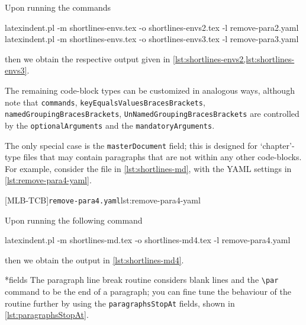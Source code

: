 	Upon running the commands \begin{widepage} \begin{commandshell}
latexindent.pl -m shortlines-envs.tex -o shortlines-envs2.tex -l remove-para2.yaml
latexindent.pl -m shortlines-envs.tex -o shortlines-envs3.tex -l remove-para3.yaml
\end{commandshell} \end{widepage} then we obtain the respective output given in \cref{lst:shortlines-envs2,lst:shortlines-envs3}.


	The remaining code-block types can be customized in analogous ways, although note that \texttt{commands}, \texttt{keyEqualsValuesBracesBrackets}, \texttt{namedGroupingBracesBrackets}, \texttt{UnNamedGroupingBracesBrackets} are controlled by the \texttt{optionalArguments} and the \texttt{mandatoryArguments}.

	The only special case is the \texttt{masterDocument} field; this is designed for `chapter'-type files that may contain paragraphs that are not within any other code-blocks.
	For example, consider the file in \cref{lst:shortlines-md}, with the YAML settings in \cref{lst:remove-para4-yaml}.

	\begin{minipage}{.45\linewidth}
	\end{minipage}
	\hfill
	\begin{minipage}{.49\linewidth}
		[MLB-TCB]{\texttt{remove-para4.yaml}}{lst:remove-para4-yaml}
	\end{minipage}

	Upon running the following command \begin{widepage} \begin{commandshell}
latexindent.pl -m shortlines-md.tex -o shortlines-md4.tex -l remove-para4.yaml
\end{commandshell} \end{widepage} then we obtain the output in \cref{lst:shortlines-md4}.

*{fields}
	The paragraph line break routine considers blank lines and the \lstinline|\par| command to be the end of a paragraph;%
	 you can fine tune the behaviour of the routine further by using the \texttt{paragraphsStopAt} fields, shown in \cref{lst:paragraphsStopAt}.

